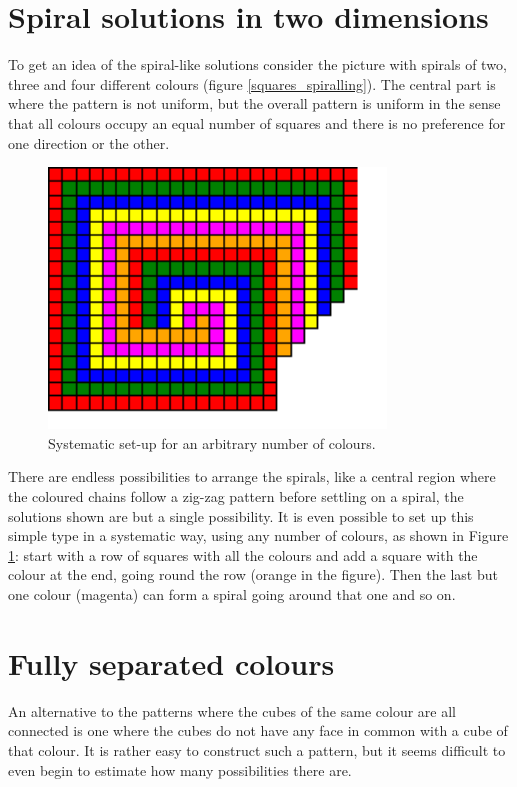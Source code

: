 \documentclass[onecolumn]{article}
\begin{document}
\section*{Spiral solutions in two dimensions}
To get an idea of the spiral-like solutions consider the picture with spirals of
two, three and four different colours (figure \ref{squares_spiralling}). The central part is where the pattern is
not uniform, but the overall pattern is uniform in the sense that all colours
occupy an equal number of squares and there is no preference for one direction
or the other.

\begin{figure}
\center
\caption{Systematic set-up for an arbitrary number of colours.}
\label{systematic_spiralling}
\includegraphics[width=0.8\textwidth]{systematic_spiralling.pdf}
\end{figure}

There are endless possibilities to arrange the spirals, like a central region where the coloured
chains follow a zig-zag pattern before settling on a spiral, the solutions shown are but a
single possibility. It is even possible to set up this simple type in a systematic way,
using any number of colours, as shown in Figure \ref{systematic_spiralling}: start with a row
of squares with all the colours and add a square with the colour at the end, going round the row (orange in the figure).
Then the last but one colour (magenta) can form a spiral going around that one and so on.


\section*{Fully separated colours}
An alternative to the patterns where the cubes of the same colour are all connected is one where the
cubes do not have any face in common with a cube of that colour. It is rather easy to construct such a pattern,
but it seems difficult to even begin to estimate how many possibilities there are.
\end{document}
